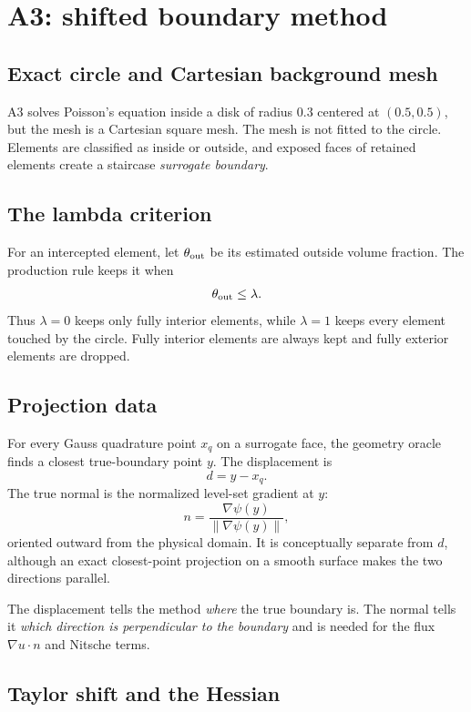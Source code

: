 \documentclass[11pt]{article}
\begin{document}
\section{A3: shifted boundary method}

\subsection{Exact circle and Cartesian background mesh}

A3 solves Poisson's equation inside a disk of radius $0.3$ centered at
$(0.5,0.5)$, but the mesh is a Cartesian square mesh. The mesh is not fitted
to the circle. Elements are classified as inside or outside, and exposed
faces of retained elements create a staircase \emph{surrogate boundary}.

\subsection{The lambda criterion}

For an intercepted element, let $\theta_{\rm out}$ be its estimated outside
volume fraction. The production rule keeps it when
\[
 \theta_{\rm out}\le \lambda.
\]
Thus $\lambda=0$ keeps only fully interior elements, while $\lambda=1$
keeps every element touched by the circle. Fully interior elements are always
kept and fully exterior elements are dropped.

\subsection{Projection data}

For every Gauss quadrature point $x_q$ on a surrogate face, the geometry
oracle finds a closest true-boundary point $y$. The displacement is
\[
 d=y-x_q.
\]
The true normal is the normalized level-set gradient at $y$:
\[
 n=\frac{\nabla\psi(y)}{\|\nabla\psi(y)\|},
\]
oriented outward from the physical domain. It is conceptually separate from
$d$, although an exact closest-point projection on a smooth surface makes the
two directions parallel.

The displacement tells the method \emph{where} the true boundary is. The
normal tells it \emph{which direction is perpendicular to the boundary} and
is needed for the flux $\nabla u\cdot n$ and Nitsche terms.

\subsection{Taylor shift and the Hessian}
\end{document}
